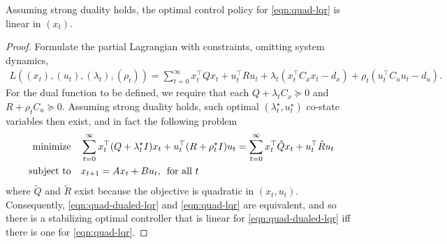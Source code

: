 \documentclass[12pt]{article}
\begin{document}
\begin{theorem}
  Assuming strong duality holds,
  the optimal control policy for \eqref{eqn:quad-lqr} is linear in \((x_t)\).
\end{theorem}
\begin{proof}
  Formulate the partial Lagrangian with constraints, omitting system dynamics,
  \begin{align*}
    L((x_t), (u_t), (\lambda_t), (\rho_t))
      = \sum_{t = 0}^{\infty}
        x_t ^\top Q x_t + u_t ^\top R u_t
        + \lambda_t (x_t ^\top C_x x_t - d_x)
        + \rho_t (u_t ^\top C_u u_t - d_u).
  \end{align*}
  For the dual function to be defined, we require that each
  \(Q + \lambda_t C_x \succeq 0\) and
  \(R + \rho_t C_u \succeq 0\).
  Assuming strong duality holds, such optimal
  \((\lambda_t ^\star, u_t ^\star)\) co-state variables then exist,
  and in fact the following problem
  \begin{align}
    \text{minimize} &\quad \sum_{t = 0}^{\infty}
        x_t ^\top (Q + \lambda_t ^\star I) x_t
        + u_t ^\top (R + \rho_t ^\star I) u_t
      = \sum_{t = 0}^{\infty}
        x_t ^\top \tilde{Q} x_t + u_t ^\top \tilde{R} u_t
      \label{eqn:quad-dualed-lqr} \\
    \text{subject to}
      &\quad x_{t + 1} = A x_t + B u_t, \enskip \text{for all \(t\)}
  \end{align}
  where \(\tilde{Q}\) and \(\tilde{R}\) exist because
  the objective is quadratic in \((x_t, u_t)\).
  Consequently, \eqref{eqn:quad-dualed-lqr} and \eqref{eqn:quad-lqr}
  are equivalent,
  and so there is a stabilizing optimal controller that is linear
  for \eqref{eqn:quad-dualed-lqr} iff there is one for \eqref{eqn:quad-lqr}.
\end{proof}


\printbibliography
\end{document}
